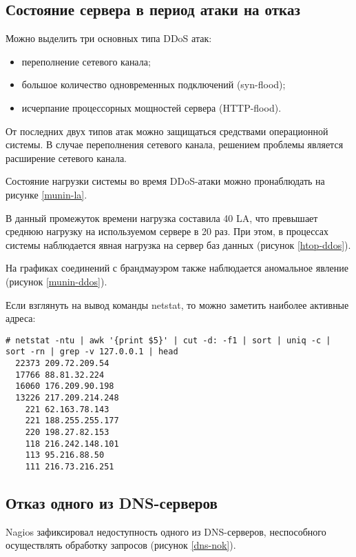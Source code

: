 \subsection{Состояние сервера в период атаки на отказ}

Можно выделить три основных типа DDoS атак:
\begin{itemize}
  \item переполнение сетевого канала;
  \item большое количество одновременных подключений (syn-flood);
  \item исчерпание процессорных мощностей сервера (HTTP-flood).
\end{itemize}

От последних двух типов атак можно защищаться средствами операционной системы.
В случае переполнения сетевого канала, решением проблемы является расширение сетевого канала.

Состояние нагрузки системы во время DDoS-атаки можно пронаблюдать на рисунке \ref{munin-la}.

В данный промежуток времени нагрузка составила 40 LA, что превышает среднюю нагрузку на используемом сервере в 20 раз.
При этом, в процессах системы наблюдается явная нагрузка на сервер баз данных (рисунок \ref{htop-ddos}).

На графиках соединений с брандмауэром также наблюдается аномальное явление (рисунок \ref{munin-ddos}).

Если взглянуть на вывод команды netstat, то можно заметить наиболее активные адреса:
\begin{lstlisting}
# netstat -ntu | awk '{print $5}' | cut -d: -f1 | sort | uniq -c | sort -rn | grep -v 127.0.0.1 | head
  22373 209.72.209.54
  17766 88.81.32.224
  16060 176.209.90.198
  13226 217.209.214.248
    221 62.163.78.143
    221 188.255.255.177
    220 198.27.82.153
    118 216.242.148.101
    113 95.216.88.50
    111 216.73.216.251
\end{lstlisting}

\subsection{Отказ одного из DNS-серверов}

Nagios зафиксировал недоступность одного из DNS-серверов, неспособного осуществлять обработку запросов (рисунок \ref{dns-nok}).

